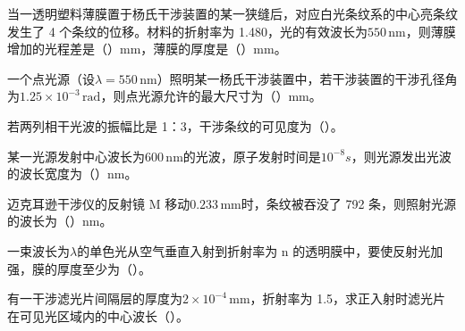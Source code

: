 \documentclass[padl, analysis, notocnum]{ExBook}
\newcommand{\answerarea}[1][3.5cm]{%
  \par\vspace{1mm}%
  \noindent{\color{themeColor!35}\rule{\linewidth}{0.4pt}}\par
  \noindent\begin{minipage}[t][#1][t]{\linewidth}\vspace{0pt}\end{minipage}\par
  \noindent{\color{themeColor!35}\rule{\linewidth}{0.4pt}}\par
}
\begin{document}
\begin{qitems}[startnum=9]
\qitem 当一透明塑料薄膜置于杨氏干涉装置的某一狭缝后，对应白光条纹系的中心亮条纹发生了 4 个条纹的位移。材料的折射率为 1.480，光的有效波长为$550\,\mathrm{nm}$，则薄膜增加的光程差是（\hspace{1.6em}）mm，薄膜的厚度是（\hspace{1.6em}）mm。
\label{q:232:start}
\answerarea[4.0cm]
\label{q:232:end}
\end{qitems}

\begin{qitems}[startnum=10]
\qitem 一个点光源（设$\lambda =550\,\mathrm{nm}$）照明某一杨氏干涉装置中，若干涉装置的干涉孔径角为$1.25\times 10^{-3}\,\mathrm{rad}$，则点光源允许的最大尺寸为（\hspace{1.6em}）mm。
\label{q:233:start}
\answerarea[4.0cm]
\label{q:233:end}
\end{qitems}

\begin{qitems}[startnum=11]
\qitem 若两列相干光波的振幅比是 1：3，干涉条纹的可见度为（\hspace{1.6em}）。
\label{q:234:start}
\answerarea[4.0cm]
\label{q:234:end}
\end{qitems}

\begin{qitems}[startnum=12]
\qitem 某一光源发射中心波长为$600\,\mathrm{nm}$的光波，原子发射时间是$10^{-8}s$，则光源发出光波的波长宽度为（\hspace{1.6em}）nm。
\label{q:235:start}
\answerarea[4.0cm]
\label{q:235:end}
\end{qitems}

\begin{qitems}[startnum=13]
\qitem 迈克耳逊干涉仪的反射镜 M 移动$0.233\,\mathrm{mm}$时，条纹被吞没了 792 条，则照射光源的波长为（\hspace{1.6em}）nm。
\label{q:236:start}
\answerarea[4.0cm]
\label{q:236:end}
\end{qitems}

\begin{qitems}[startnum=14]
\qitem 一束波长为$\lambda$的单色光从空气垂直入射到折射率为 n 的透明膜中，要使反射光加强，膜的厚度至少为（\hspace{1.6em}）。
\label{q:237:start}
\answerarea[4.0cm]
\label{q:237:end}
\end{qitems}

\begin{qitems}[startnum=15]
\qitem 有一干涉滤光片间隔层的厚度为$2\times 10^{-4}\,\mathrm{mm}$，折射率为 1.5，求正入射时滤光片在可见光区域内的中心波长（\hspace{1.6em}）。
\label{q:238:start}
\answerarea[4.0cm]
\label{q:238:end}
\end{qitems}
\end{document}
